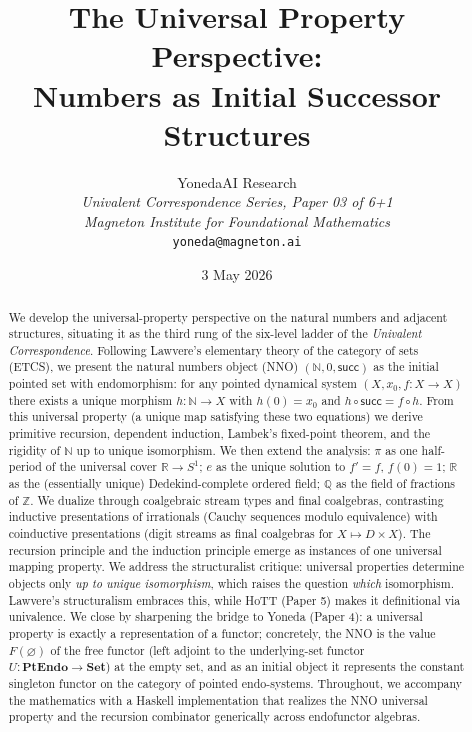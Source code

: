 \documentclass[12pt]{article}
\title{The Universal Property Perspective:\\
Numbers as Initial Successor Structures}
\author{YonedaAI Research \\
\textit{Univalent Correspondence Series, Paper 03 of 6+1} \\
\textit{Magneton Institute for Foundational Mathematics} \\
\texttt{yoneda@magneton.ai}}
\date{3 May 2026}
\theoremstyle{definition}
\theoremstyle{remark}
\newcommand{\N}{\mathbb{N}}
\newcommand{\Z}{\mathbb{Z}}
\newcommand{\Q}{\mathbb{Q}}
\newcommand{\R}{\mathbb{R}}
\newcommand{\Set}{\mathbf{Set}}
\newcommand{\suc}{\mathsf{succ}}
\newcommand{\PtEndo}{\mathbf{PtEndo}}
\begin{document}
\maketitle

\begin{abstract}
We develop the universal-property perspective on the natural numbers and adjacent structures, situating it as the third rung of the six-level ladder of the \emph{Univalent Correspondence}. Following Lawvere's elementary theory of the category of sets (ETCS), we present the natural numbers object (NNO) $(\N, 0, \suc)$ as the initial pointed set with endomorphism: for any pointed dynamical system $(X, x_0, f \colon X \to X)$ there exists a unique morphism $h \colon \N \to X$ with $h(0) = x_0$ and $h \circ \suc = f \circ h$. From this universal property (a unique map satisfying these two equations) we derive primitive recursion, dependent induction, Lambek's fixed-point theorem, and the rigidity of $\N$ up to unique isomorphism. We then extend the analysis: $\pi$ as one half-period of the universal cover $\R \to S^1$; $e$ as the unique solution to $f' = f$, $f(0) = 1$; $\R$ as the (essentially unique) Dedekind-complete ordered field; $\Q$ as the field of fractions of $\Z$. We dualize through coalgebraic stream types and final coalgebras, contrasting inductive presentations of irrationals (Cauchy sequences modulo equivalence) with coinductive presentations (digit streams as final coalgebras for $X \mapsto D \times X$). The recursion principle and the induction principle emerge as instances of one universal mapping property. We address the structuralist critique: universal properties determine objects only \emph{up to unique isomorphism}, which raises the question \emph{which} isomorphism. Lawvere's structuralism embraces this, while HoTT (Paper 5) makes it definitional via univalence. We close by sharpening the bridge to Yoneda (Paper 4): a universal property is exactly a representation of a functor; concretely, the NNO is the value $F(\varnothing)$ of the free functor (left adjoint to the underlying-set functor $U \colon \PtEndo \to \Set$) at the empty set, and as an initial object it represents the constant singleton functor on the category of pointed endo-systems. Throughout, we accompany the mathematics with a Haskell implementation that realizes the NNO universal property and the recursion combinator generically across endofunctor algebras.
\end{abstract}

\tableofcontents
\end{document}
